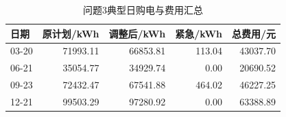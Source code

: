 \begin{table}[H]
\centering\small
\caption{问题3典型日购电与费用汇总}
\label{tab:q3_daily_summary}
\begin{tabular}{lrrrr}\toprule
日期 & 原计划/kWh & 调整后/kWh & 紧急/kWh & 总费用/元 \\\midrule
03-20 & 71993.11 & 66853.81 & 113.04 & 43037.70 \\
06-21 & 35054.77 & 34929.74 & 0.00 & 20690.52 \\
09-23 & 72432.47 & 67541.88 & 464.02 & 46227.25 \\
12-21 & 99503.29 & 97280.92 & 0.00 & 63388.89 \\
\bottomrule\end{tabular}
\end{table}
